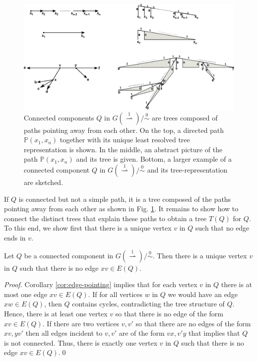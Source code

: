 \documentclass[smallextended]{svjour3}
\newcommand{\TODO}[1]{\begingroup\color{red}#1\endgroup}
\newcommand{\Ro}{\mathrel{\overset{0}{\sim}}}
\newcommand{\Rld}{\mathrel{\overset{1}{\rightharpoonup}}}
\begin{document}
\begin{figure}
\begin{center}
\includegraphics[width=1.\textwidth]{di-path-tree.eps}
\end{center}
\caption{Connected components $Q$ in $G(\Rld)/\Ro$ are trees composed of
  paths pointing away from each other.  On the top, a directed path
  $\mathbb P(x_1,x_n)$ together with its unique least resolved tree
  representation is shown. In the middle, an abstract picture of the path
  $\mathbb P(x_1,x_n)$ and its tree is given.  Bottom, a larger example of
  a connected component $Q$ in $G(\Rld)/\Ro$ and its tree-representation
  are sketched.}
\label{fig:Qtree}
\end{figure}

If $Q$ is connected but not a simple path, it is a tree composed of the
paths pointing away from each other as shown in Fig. \ref{fig:Qtree}. It
remains to show how to connect the distinct trees that explain these paths
to obtain a tree $T(Q)$ for $Q$.  To this end, we show first that there is
a unique vertex $v$ in $Q$ such that no edge ends in $v$.

\begin{lemma}
  Let $Q$ be a connected component in $G(\Rld)/\Ro$.  Then there is a
  unique vertex $v$ in $Q$ such that there is no edge $xv\in E(Q)$.
  \label{lem:unique-v}
\end{lemma}
\begin{proof}
  Corollary \ref{cor:edge-pointing} implies that for each vertex $v$ in $Q$
  there is at most one edge $xv\in E(Q)$.  If for all vertices $w$ in $Q$
  we would have an edge $xw\in E(Q)$, then $Q$ contains cycles,
  contradicting the tree structure of $Q$. Hence, there is at least one
  vertex $v$ so that there is no edge of the form $xv\in E(Q)$.  If there
  are two vertices $v,v'$ so that there are no edges of the form $xv, yv'$
  then all edges incident to $v,v'$ are of the form $vx, v'y$ \TODO{that
    implies that $Q$ is not connected.} Thus, there is exactly one vertex
  $v$ in $Q$ such that there is no edge $xv\in E(Q)$.\qed
\end{proof}
\end{document}
